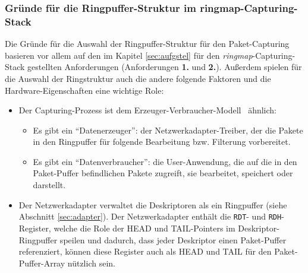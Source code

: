 \subsubsection{Gründe für die Ringpuffer-Struktur im ringmap-Capturing-Stack}
Die Gründe für die Auswahl der Ringpuffer-Struktur für den Paket-Capturing
basieren vor allem auf den im Kapitel \ref{sec:aufgstel} für den 
\emph{ringmap}-Capturing-Stack gestellten Anforderungen (Anforderungen \textbf{1.} und
\textbf{2.}). Außerdem spielen für die Auswahl der Ringstruktur auch die
andere folgende Faktoren und die Hardware-Eigenschaften eine wichtige Role:
\begin{itemize}
	\item Der Capturing-Prozess ist dem
		Erzeuger-Verbraucher-Modell~\cite{erz_verbr_wiki} ähnlich:
		\begin{itemize}
			\item Es gibt ein ``Datenerzeuger'': der Netzwerkadapter-Treiber, der die
				Pakete in den Ringpuffer für folgende Bearbeitung bzw.
				Filterung vorbereitet.
			\item Es gibt  ein ``Datenverbraucher'': die User-Anwendung, die
				auf die in den Paket-Puffer befindlichen Pakete zugreift,
				sie bearbeitet, speichert oder darstellt.
		\end{itemize}
	\item Der Netzwerkadapter verwaltet die Deskriptoren als ein Ringpuffer (siehe
		Abschnitt \ref{sec:adapter}).  Der Netzwerkadapter enthält die
		\verb+RDT+- und \verb+RDH+-Register, welche die Role der HEAD und
		TAIL-Pointers im Deskriptor-Ringpuffer speilen und dadurch, dass jeder
		Deskriptor einen Paket-Puffer referenziert, können diese Register auch
		als HEAD und TAIL für den Paket-Puffer-Array nützlich sein.
\end{itemize}

